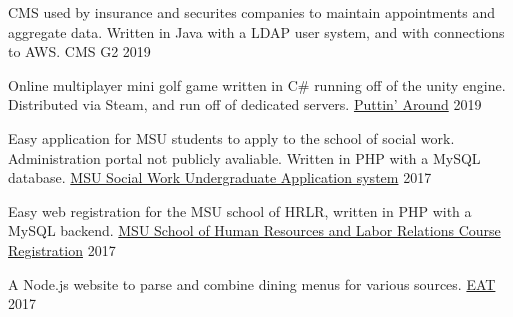 
\begin{cventries}
  \cventry
    {CMS used by insurance and securites companies to maintain appointments and aggregate data.
    Written in Java with a LDAP user system, and with connections to AWS.}
    {CMS G2}
    {}
    {2019}
    {
    }

  \cventry
    {Online multiplayer mini golf game written in C\# running off of the unity engine. Distributed via Steam,
    and run off of dedicated servers.}
    {\href{https://store.steampowered.com/app/1002650/Puttin_Around/}{Puttin' Around}}
    {}
    {2019}
    {
    }

    \cventry
    {Easy application for MSU students to apply to the school of social work. Administration portal not publicly avaliable.
    Written in PHP with a MySQL database.}
    {\href{https://swdb.socialwork.msu.edu/basw/}{MSU Social Work Undergraduate Application system}}
    {}
    {2017}
    {
    }

    \cventry
    {Easy web registration for the MSU school of HRLR, written in PHP with a MySQL backend. }
    {\href{https://hrlr.msu.edu/registration/login.php}{MSU School of Human Resources and Labor Relations Course Registration}}
    {}
    {2017}
    {
    }

  \cventry
    {A Node.js website to parse and combine dining menus for various sources.}
    {\href{https://github.com/oonis/eat}{EAT}}
    {}
    {2017}
    {
    }



\end{cventries}
